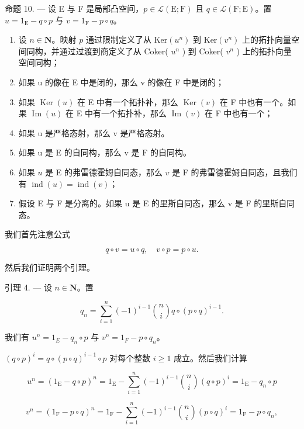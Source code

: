 命题 10. --- 设 E 与 F 是局部凸空间，\(p \in \mathcal{L}(\mathrm{E};\mathrm{F})\) 且 \(q \in \mathcal{L}(\mathrm{F};\mathrm{E})\)。置 \(u = 1_{\mathrm{E}} - q \circ p\) 与 \(v = 1_{\mathrm{F}} - p \circ q\)。

\begin{enumerate}
\def\labelenumi{\alph{enumi})}
\item
  设 \(n \in \mathbf{N}\)。映射 \(p\) 通过限制定义了从 \(\mathrm{Ker}(u^n)\) 到 \(\mathrm{Ker}(v^n)\) 上的拓扑向量空间同构，并通过过渡到商定义了从 Coker( \(u^n\) ) 到 Coker( \(v^n\) ) 上的拓扑向量空间同构；
\item
  如果 u 的像在 E 中是闭的，那么 v 的像在 F 中是闭的；
\item
   如果 \(\operatorname{Ker}(u)\) 在 E 中有一个拓扑补，那么 \(\operatorname{Ker}(v)\) 在 F 中也有一个。如果 \(\operatorname{Im}(u)\) 在 E 中有一个拓扑补，那么 \(\operatorname{Im}(v)\) 在 F 中也有一个；
\item
  如果 u 是严格态射，那么 v 是严格态射。
\item
  如果 u 是 E 的自同构，那么 v 是 F 的自同构。
\item
  如果 \(u\) 是 E 的弗雷德霍姆自同态，那么 \(v\) 是 F 的弗雷德霍姆自同态，且我们有 \(\operatorname{ind}(u) = \operatorname{ind}(v)\)；
\item
  假设 E 与 F 是分离的。如果 u 是 E 的里斯自同态，那么 v 是 F 的里斯自同态。
\end{enumerate}

我们首先注意公式

\[
q \circ v = u \circ q, \quad v \circ p = p \circ u.\tag{6}
\]

然后我们证明两个引理。

引理 4. --- 设 \(n \in \mathbf{N}\)。置

\[
q _ {n} = \sum_ {i = 1} ^ {n} (- 1) ^ {i - 1} \binom {n} {i} q \circ (p \circ q) ^ {i - 1}.
\]

我们有 \(u^{n}=1_{E}-q_{n}\circ p\) 与 \(v^{n}=1_{F}-p\circ q_{n}\)。

\((q\circ p)^{i} = q\circ (p\circ q)^{i - 1}\circ p\) 对每个整数 \(i\geqslant 1\) 成立。然后我们计算

\[
u ^ {n} = (1 _ {\mathrm{E}} - q \circ p) ^ {n} = 1 _ {\mathrm{E}} - \sum_ {i = 1} ^ {n} (- 1) ^ {i - 1} {\binom {n} {i}} (q \circ p) ^ {i} = 1 _ {\mathrm{E}} - q _ {n} \circ p
\]

\[
v ^ {n} = (1 _ {\mathrm{F}} - p \circ q) ^ {n} = 1 _ {\mathrm{F}} - \sum_ {i = 1} ^ {n} (- 1) ^ {i - 1} \binom {n} {i} (p \circ q) ^ {i} = 1 _ {\mathrm{F}} - p \circ q _ {n},
\]

